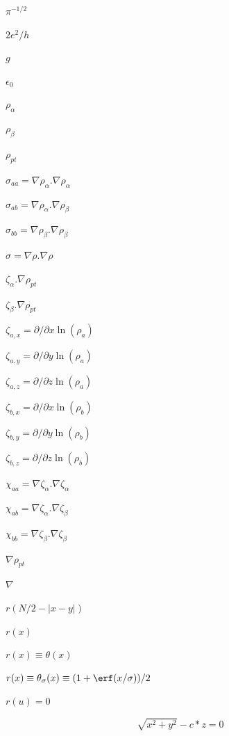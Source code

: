 \documentclass{article}
\begin{document}
$\pi^{-1/2}$
\pagebreak

$ 2e^2/h $
\pagebreak

$ g $
\pagebreak

$\epsilon_0$
\pagebreak

$ \rho_\alpha $
\pagebreak

$ \rho_\beta $
\pagebreak

$ \rho_{pt} $
\pagebreak

$ \sigma_{aa} = \nabla \rho_{\alpha}.\nabla \rho_{\alpha} $
\pagebreak

$ \sigma_{ab} = \nabla \rho_{\alpha}.\nabla \rho_{\beta} $
\pagebreak

$ \sigma_{bb} = \nabla \rho_{\beta}.\nabla \rho_{\beta} $
\pagebreak

$ \sigma = \nabla \rho.\nabla \rho $
\pagebreak

$ \zeta_{\alpha}.\nabla\rho_{pt} $
\pagebreak

$ \zeta_{\beta}.\nabla\rho_{pt} $
\pagebreak

$ \zeta_{a,x}=\partial/{\partial x} \ln(\rho_a)  $
\pagebreak

$ \zeta_{a,y}=\partial/{\partial y} \ln(\rho_a)  $
\pagebreak

$ \zeta_{a,z}=\partial/{\partial z} \ln(\rho_a)  $
\pagebreak

$ \zeta_{b,x} = \partial/{\partial x} \ln(\rho_b)  $
\pagebreak

$ \zeta_{b,y} = \partial/{\partial y} \ln(\rho_b)  $
\pagebreak

$ \zeta_{b,z} = \partial/{\partial z} \ln(\rho_b)  $
\pagebreak

$ \chi_{aa} = \nabla \zeta_{\alpha}.\nabla \zeta_{\alpha} $
\pagebreak

$ \chi_{ab} = \nabla \zeta_{\alpha}.\nabla \zeta_{\beta} $
\pagebreak

$ \chi_{bb} = \nabla \zeta_{\beta}.\nabla \zeta_{\beta} $
\pagebreak

$ \nabla\rho_{pt}$
\pagebreak

$ \nabla $
\pagebreak

$ r(N/2 - |x-y|) $
\pagebreak

$ r(x) $
\pagebreak

$ r(x) \equiv \theta(x)$
\pagebreak

$ r(x) \equiv \theta_\sigma(x) \equiv (1 + \erf(x/\sigma))/2 $
\pagebreak

$r(u) = 0$
\pagebreak

\[ \sqrt{x^2 + y^2} - c * z = 0 \]
\pagebreak
\end{document}
